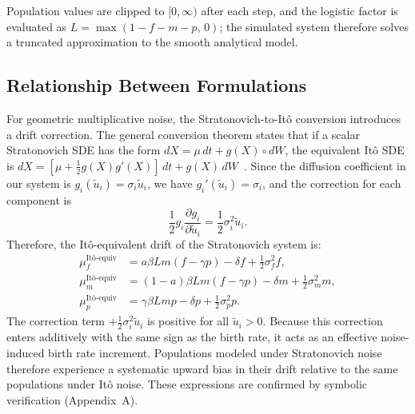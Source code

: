 \documentclass[12pt]{article}
\begin{document}
Population values are clipped to $[0, \infty)$ after each step, and the
logistic factor is evaluated as $L = \max(1 - f - m - p,\, 0)$; the
simulated system therefore solves a truncated approximation to the smooth
analytical model.


\subsection{Relationship Between Formulations}
For geometric multiplicative noise, the Stratonovich-to-It\^{o} conversion introduces a drift correction.  The general conversion theorem states that if a scalar Stratonovich SDE has the form $dX = \mu\,dt + g(X)\circ dW$, the equivalent It\^{o} SDE is $dX = [\mu + \tfrac{1}{2}g(X)g'(X)]\,dt + g(X)\,dW$~\citep{Oksendal2003}.  Since the diffusion coefficient in our system is $g_i(\tilde{u}_i) = \sigma_i \tilde{u}_i$, we have $g_i'(\tilde{u}_i) = \sigma_i$, and the correction for each component is
\begin{equation}
  \frac{1}{2} g_i \frac{\partial g_i}{\partial \tilde{u}_i} = \frac{1}{2} \sigma_i^2 \tilde{u}_i.
\end{equation}
Therefore, the It\^{o}-equivalent drift of the Stratonovich system is:
\begin{align}
  \mu_f^{\text{It\^{o}-equiv}} &= a\beta L m(f - \gamma p) - \delta f + \tfrac{1}{2}\sigma_f^2 f, \\
  \mu_m^{\text{It\^{o}-equiv}} &= (1-a)\beta L m(f - \gamma p) - \delta m + \tfrac{1}{2}\sigma_m^2 m, \\
  \mu_p^{\text{It\^{o}-equiv}} &= \gamma\beta L m p - \delta p + \tfrac{1}{2}\sigma_p^2 p.
\end{align}
The correction term $+\tfrac{1}{2}\sigma_i^2 \tilde{u}_i$ is positive for all $\tilde{u}_i > 0$.  Because this correction enters additively with the same sign as the birth rate, it acts as an effective noise-induced birth rate increment.  Populations modeled under Stratonovich noise therefore experience a systematic upward bias in their drift relative to the same populations under It\^{o} noise.  These expressions are confirmed by symbolic verification (Appendix~A).
\end{document}
